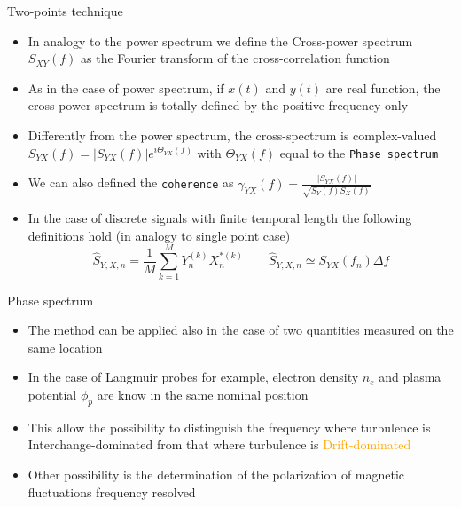 \documentclass[t,10pt]{beamer}
\begin{document}
\begin{frame}{Two-points technique}
\begin{itemize}[<+->]
\item In analogy to the power spectrum we define the
  \textcolor{tascarletred}{Cross-power spectrum $S_{XY}(f)$} as the
  Fourier transform of the cross-correlation function
\item As in the case of power spectrum, if $x(t)$ and $y(t)$ are real
  function, the cross-power spectrum is totally defined by the
  positive frequency only
\item Differently from the power spectrum, the cross-spectrum is
  complex-valued $S_{YX}(f)=|S_{YX}(f)|e^{i\Theta_{YX}(f)}$ with
  $\Theta_{YX}(f)$ equal to the \textcolor{tascarletred}{\texttt{Phase
    spectrum}}
\item We can also defined the
  \textcolor{tascarletred}{\texttt{coherence}} as $\gamma_{YX}(f)=\frac{|S_{YX}(f)|}{\sqrt{S_Y(f)S_X(f)}}$
\item In the case of discrete signals with finite temporal length the following definitions hold
  (in analogy to single point case)
\begin{equation*}
\hat{S}_{Y,X,n}= \frac{1}{M}\sum_{k=1}^MY_n^{(k)}X_n^{*(k)} \qquad
\hat{S}_{Y,X,n}\simeq S_{YX}(f_n)\Delta f
\end{equation*}
\end{itemize}
\end{frame}

\begin{frame}{Phase spectrum}
\begin{itemize}[<+->]
\item The method can be applied also in the case of two quantities
  measured on the same location
\item In the case of Langmuir probes for example, electron density
  $n_e$ and plasma potential $\phi_p$ are know in the same nominal
  position


\item This allow the possibility to distinguish the frequency where
  turbulence is \textcolor{rfxcyan}{Interchange-dominated} from that
  where turbulence is \textcolor{orange}{Drift-dominated}
\item Other possibility is the determination of the polarization of
  magnetic fluctuations frequency resolved 
\end{itemize}
\end{frame}
\end{document}
